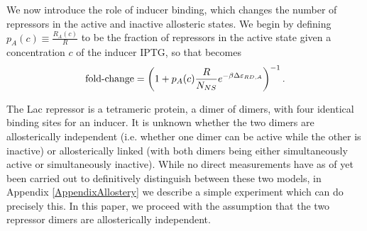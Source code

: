 We now introduce the role of inducer binding, which changes the number of
repressors in the active and inactive allosteric states. We begin by defining
\(p_A(c) \equiv \frac{R_A(c)}{R}\) to be the fraction of repressors in the
active state given a concentration \(c\) of the inducer IPTG, so that %
\eref[eq4] becomes
\begin{equation}
\operatorname{fold-change} = \left( 1+p_A(c) \frac{R}{N_{NS}}e^{-\beta
	\Delta\varepsilon_{RD,A}} \right)^{-1}. \label{eq5}
\end{equation}

The Lac repressor is a tetrameric protein, a dimer of dimers, with four
identical binding sites for an inducer. It is unknown whether the two dimers are
allosterically independent (i.e. whether one dimer can be active while the other
is inactive) or allosterically linked (with both dimers being either
simultaneously active or simultaneously inactive). While no direct measurements
have as of yet been carried out to definitively distinguish between these two
models, in Appendix \ref{AppendixAllostery} we describe a simple experiment
which can do precisely this. In this paper, we proceed with the assumption that
the two repressor dimers are allosterically independent. 


